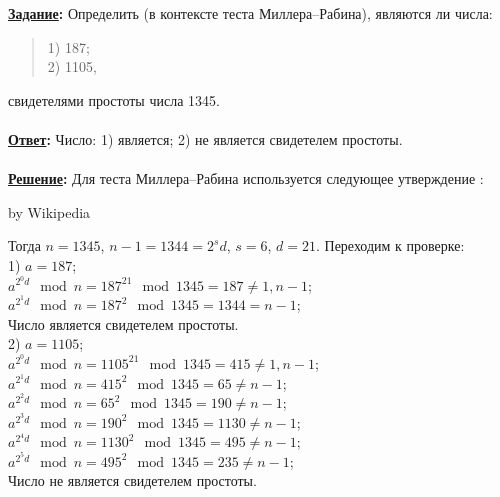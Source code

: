 \documentclass{article}
\begin{document}
\textbf{\uline{Задание}:} Определить (в контексте теста Миллера--Рабина), являются ли числа:
\begin{flushleft}
\begin{verse}
1) 187;\\
2) 1105,\end{verse}
\end{flushleft}
свидетелями простоты числа 1345.\\
\\
\textbf{\uline{Ответ}:} Число: 1) является; 2) не является свидетелем простоты.\\
\\
\textbf{ \uline{Решение}: } Для теста Миллера--Рабина используется следующее утверждение : \\
\noindent{}
\begin{flushright}\footnotesize by Wikipedia \end{flushright}
Тогда $n=1345$, $n-1=1344=2^{s}d$, $s=6$, $d=21$. Переходим к проверке:\\
1) $a=187$;\\
$a^{2^{0}d}\mod n=187^{21}\mod 1345=187\not=1, n-1$;\\
$a^{2^{1}d}\mod n=187^{2}\mod 1345=1344=n-1$;\\
Число является свидетелем простоты.\\
2) $a=1105$;\\
$a^{2^{0}d}\mod n=1105^{21}\mod 1345=415\not=1, n-1$;\\
$a^{2^{1}d}\mod n=415^{2}\mod 1345=65\not=n-1$;\\
$a^{2^{2}d}\mod n=65^{2}\mod 1345=190\not=n-1$;\\
$a^{2^{3}d}\mod n=190^{2}\mod 1345=1130\not=n-1$;\\
$a^{2^{4}d}\mod n=1130^{2}\mod 1345=495\not=n-1$;\\
$a^{2^{5}d}\mod n=495^{2}\mod 1345=235\not=n-1$;\\
Число не является свидетелем простоты.\\
\end{document}
